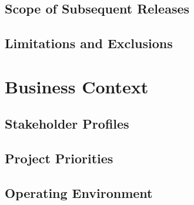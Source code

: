 \documentclass[12pt]{article}
\begin{document}
\subsection{Scope of Subsequent Releases}

\subsection{Limitations and Exclusions}


\section{Business Context}

\subsection{Stakeholder Profiles}

\subsection{Project Priorities}

\subsection{Operating Environment}
\end{document}
